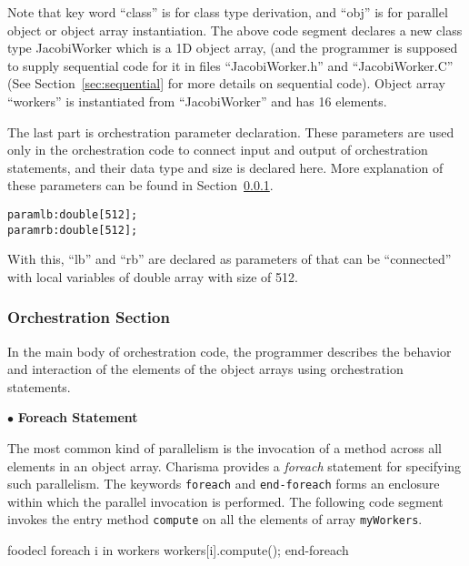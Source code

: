 \documentclass[10pt]{article}
\def\smallfbox#1{{\small \fbox{#1}}}
\def\code#1{{\small {\tt {#1}}}}
\begin{document}
Note that key word ``class'' is for class type derivation, and ``obj'' is for
parallel object or object array instantiation. The above code segment declares a
new class type JacobiWorker which is a 1D object array, (and the programmer is
supposed to supply sequential code for it in files ``JacobiWorker.h'' and
``JacobiWorker.C'' (See Section~\ref{sec:sequential} for more details on
sequential code). Object array ``workers'' is instantiated from ``JacobiWorker''
and has 16 elements.

The last part is orchestration parameter declaration. These parameters are used
only in the orchestration code to connect input and output of orchestration
statements, and their data type and size is declared here. More explanation of
these parameters can be found in Section~\ref{sec:orchsec}. 

\begin{alltt}
    param lb : double[512];
    param rb : double[512];
\end{alltt}

With this, ``lb'' and ``rb'' are declared as parameters of that can be 
``connected'' with local variables of double array with size of 512. 

\subsubsection{Orchestration Section}
\label{sec:orchsec}

In the main body of orchestration code, the programmer describes the behavior
and interaction of the elements of the object arrays using orchestration
statements.

$\bullet$ {\bf Foreach Statement}

The most common kind of parallelism is the invocation of a method
across all elements in an object array. Charisma provides a {\em foreach}
statement for specifying such parallelism. The keywords \code{foreach} and
\code{end-foreach} forms an enclosure within which the parallel invocation is
performed. The following code segment invokes the entry method \code{compute} on
all the elements of array \code{myWorkers}. 

\begin{SaveVerbatim}{foodecl}
  foreach i in workers
    workers[i].compute();
  end-foreach
\end{SaveVerbatim}
\vspace{0.1in}
\smallfbox{\BUseVerbatim{foodecl}}
\vspace{0.1in}
\end{document}
